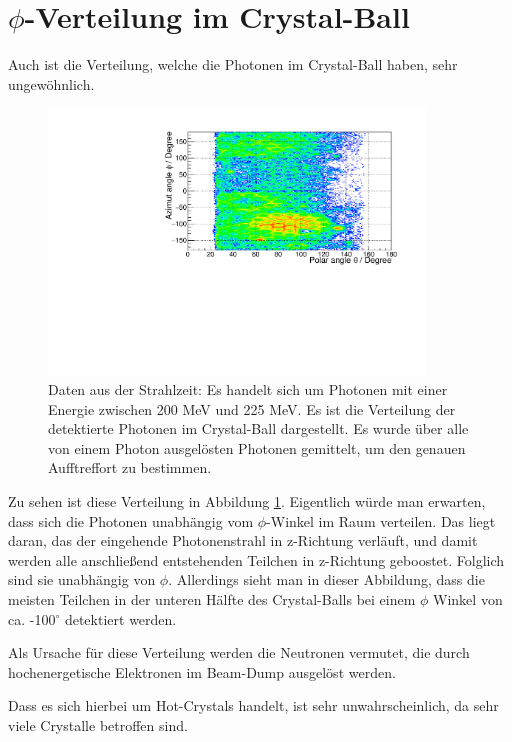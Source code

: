 \documentclass[a4paper,11pt,oneside,final,german,openbib,pdftex]{scrbook}
\begin{document}
{\section{$\phi$-Verteilung im Crystal-Ball}

Auch ist die Verteilung, welche die Photonen im Crystal-Ball haben, sehr ungew\"ohnlich.

\begin{figure}[h!]
	\begin{center}
		\includegraphics[width=100mm]{NewCalib/ThetaPhiVerteilung/20172404ThetaPhi200MeVBeam}
		\caption[Strahlzeit: Symmetrische Photonen; Verteilung der detektierten Photonen im CB]{Daten aus der Strahlzeit: Es handelt sich um Photonen mit einer Energie zwischen 200 MeV und 225 MeV. Es ist die Verteilung der detektierte Photonen im Crystal-Ball dargestellt. Es wurde \"uber alle von einem Photon ausgel\"osten Photonen gemittelt, um den genauen Aufftreffort zu bestimmen.}
		\label{fig:Verteilung-der-Photonen-im-CB}
	\end{center}
\end{figure}
Zu sehen ist diese Verteilung in Abbildung \ref{fig:Verteilung-der-Photonen-im-CB}. Eigentlich w\"urde man erwarten, dass sich die Photonen unabh\"angig vom $\phi$-Winkel im Raum verteilen. Das liegt daran, das der eingehende Photonenstrahl in z-Richtung verl\"auft, und damit werden alle anschlie{\ss}end entstehenden Teilchen in z-Richtung geboostet. Folglich sind sie unabh\"angig von $\phi$. 
Allerdings sieht man in dieser Abbildung, dass die meisten Teilchen in der unteren H\"alfte des Crystal-Balls bei einem $\phi$ Winkel von ca. -100$^{\circ}$ detektiert werden.

Als Ursache f\"ur diese Verteilung werden die Neutronen vermutet, die durch hochenergetische Elektronen im Beam-Dump ausgel\"ost werden. 

Dass es sich hierbei um Hot-Crystals handelt, ist sehr unwahrscheinlich, da sehr viele Crystalle betroffen sind.

}
\end{document}
